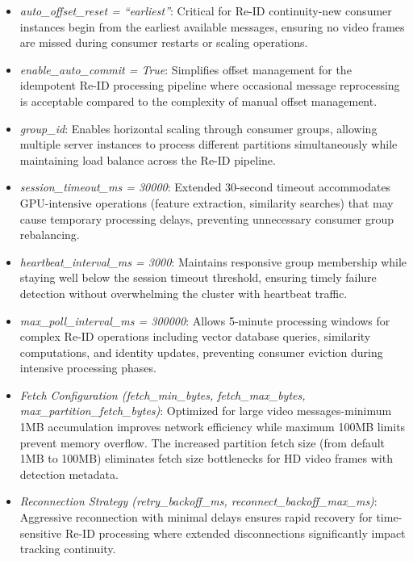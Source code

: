 \begin{itemize}
    \item \textit{auto\_offset\_reset = ``earliest''}: Critical for Re-ID continuity-new consumer instances begin from the earliest available messages, ensuring no video frames are missed during consumer restarts or scaling operations.
    
    \item \textit{enable\_auto\_commit = True}: Simplifies offset management for the idempotent Re-ID processing pipeline where occasional message reprocessing is acceptable compared to the complexity of manual offset management.
    
    \item \textit{group\_id}: Enables horizontal scaling through consumer groups, allowing multiple server instances to process different partitions simultaneously while maintaining load balance across the Re-ID pipeline.
    
    \item \textit{session\_timeout\_ms = 30000}: Extended 30-second timeout accommodates GPU-intensive operations (feature extraction, similarity searches) that may cause temporary processing delays, preventing unnecessary consumer group rebalancing.
    
    \item \textit{heartbeat\_interval\_ms = 3000}: Maintains responsive group membership while staying well below the session timeout threshold, ensuring timely failure detection without overwhelming the cluster with heartbeat traffic.
    
    \item \textit{max\_poll\_interval\_ms = 300000}: Allows 5-minute processing windows for complex Re-ID operations including vector database queries, similarity computations, and identity updates, preventing consumer eviction during intensive processing phases.
    
    \item \textit{Fetch Configuration (fetch\_min\_bytes, fetch\_max\_bytes, max\_partition\_fetch\_bytes)}: Optimized for large video messages-minimum 1MB accumulation improves network efficiency while maximum 100MB limits prevent memory overflow. The increased partition fetch size (from default 1MB to 100MB) eliminates fetch size bottlenecks for HD video frames with detection metadata.
    
    \item \textit{Reconnection Strategy (retry\_backoff\_ms, reconnect\_backoff\_max\_ms)}: Aggressive reconnection with minimal delays ensures rapid recovery for time-sensitive Re-ID processing where extended disconnections significantly impact tracking continuity.
\end{itemize}

